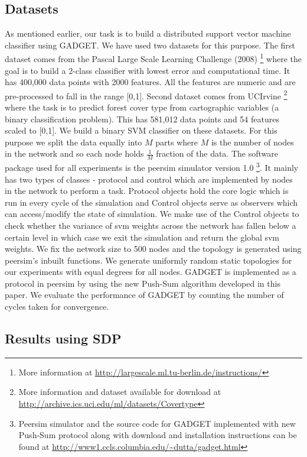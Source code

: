 \documentclass[runningheads,a4paper]{llncs}
\begin{document}
\subsection{Datasets}

As mentioned earlier, our task is to build a distributed support vector machine classifier using GADGET. We have used two datasets for this purpose. The first dataset comes from the Pascal Large Scale Learning Challenge (2008)  \footnote{More information at \url{http://largescale.ml.tu-berlin.de/instructions/}} where the goal is to build a 2-class classifier with lowest error and computational time. It has 400,000 data points with 2000 features. All the features are numeric and are pre-processed to fall in the range [0,1]. Second dataset comes from UCIrvine \footnote{More information and dataset available for download at \url{http://archive.ics.uci.edu/ml/datasets/Covertype}} where the task is to predict forest cover type from cartographic variables (a binary classification problem). This has 581,012 data points and 54 features scaled to [0,1]. We build a binary SVM classifier on these datasets. For this purpose we split the data equally into $M$ parts where $M$ is the number of nodes in the network and so each node holds $\frac{1}{M}$ fraction of the data. The software package used for all experiments is the peersim simulator \cite{p2p09-peersim} version 1.0  \footnote{Peersim simulator and the source code for GADGET implemented with new Push-Sum protocol along with download and installation instructions can be found at \url{http://www1.ccls.columbia.edu/~dutta/gadget.html}}. It mainly has two types of classes - protocol and control which are implemented by nodes in the network to perform a task. Protocol objects hold the core logic which is run in every cycle of the simulation and Control objects serve as observers which can access/modify the state of simulation. We make use of the Control objects to check whether the variance of svm weights across the network has fallen below a certain level in which case we exit the simulation and return the global svm weights. We fix the network size to 500 nodes and the topology is generated using peersim's inbuilt functions. We generate uniformly random static topologies for our experiments with equal degrees for all nodes. GADGET is implemented as a protocol in peersim by using the new Push-Sum algorithm developed in this paper. We evaluate the performance of GADGET by counting the number of cycles taken for convergence.

\subsection{Results using SDP}
\end{document}
